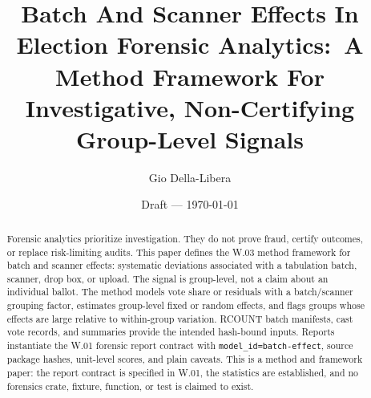 \documentclass[12pt]{article}
\title{Batch And Scanner Effects In Election Forensic Analytics:\
A Method Framework For Investigative, Non-Certifying Group-Level Signals}
\author{Gio Della-Libera}
\date{Draft --- \today}
\begin{document}
\maketitle

\begin{abstract}
Forensic analytics prioritize investigation. They do not prove fraud, certify
outcomes, or replace risk-limiting audits. This paper defines the W.03 method
framework for batch and scanner effects: systematic deviations associated with a
tabulation batch, scanner, drop box, or upload. The signal is group-level, not a
claim about an individual ballot. The method models vote share or residuals with
a batch/scanner grouping factor, estimates group-level fixed or random effects,
and flags groups whose effects are large relative to within-group variation.
RCOUNT batch manifests, cast vote records, and summaries provide the intended
hash-bound inputs. Reports instantiate the W.01 forensic report contract with
\texttt{model\_id=batch-effect}, source package hashes, unit-level scores, and
plain caveats. This is a method and framework paper: the report contract is
specified in W.01, the statistics are established, and no forensics crate,
fixture, function, or test is claimed to exist.
\end{abstract}








\nocite{rcount-overview-2026,w-series-forensics-contract-2026}


\end{document}

